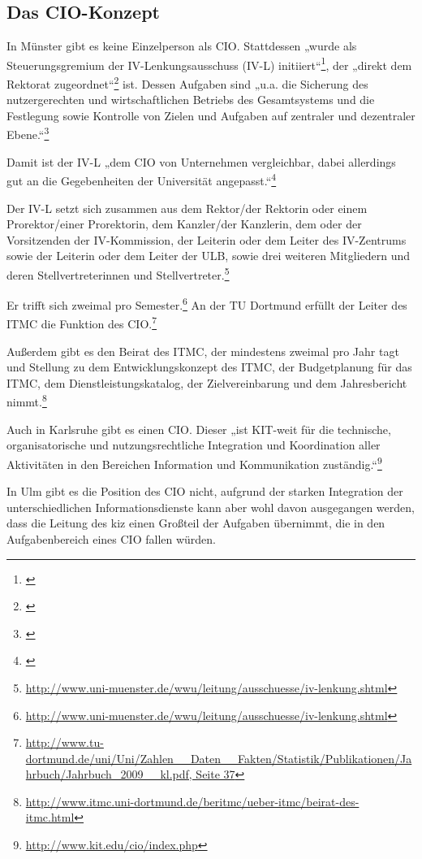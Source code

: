 \subsection{Das CIO-Konzept}
In Münster gibt es keine Einzelperson als CIO. Stattdessen „wurde als Steuerungsgremium der IV-Lenkungsausschuss (IV-L) initiiert“\footnote{\cite[59]{bode_informationsmanagement_2010}}, der „direkt dem Rektorat zugeordnet“\footnote{\cite[59]{bode_informationsmanagement_2010}} ist. Dessen Aufgaben sind „u.a. die Sicherung des nutzergerechten und wirtschaftlichen Betriebs des Gesamtsystems und die Festlegung sowie Kontrolle von Zielen und Aufgaben auf zentraler und dezentraler Ebene.“\footnote{\cite[9]{vogl_bericht_2013}}

Damit ist der IV-L „dem CIO von Unternehmen vergleichbar, dabei allerdings gut an die Gegebenheiten der Universität angepasst.“\footnote{\cite[60]{bode_informationsmanagement_2010}}

Der IV-L setzt sich zusammen aus dem Rektor/der Rektorin oder einem Prorektor/einer Prorektorin, dem Kanzler/der Kanzlerin, dem oder der Vorsitzenden der IV-Kommission, der Leiterin oder dem Leiter des IV-Zentrums sowie der Leiterin oder dem Leiter der ULB, sowie drei weiteren Mitgliedern und deren Stellvertreterinnen und Stellvertreter.\footnote{\url{http://www.uni-muenster.de/wwu/leitung/ausschuesse/iv-lenkung.shtml}}

Er trifft sich zweimal pro Semester.\footnote{\url{http://www.uni-muenster.de/wwu/leitung/ausschuesse/iv-lenkung.shtml}}
An der TU Dortmund erfüllt der Leiter des ITMC die Funktion des CIO.\footnote{\url{http://www.tu-dortmund.de/uni/Uni/Zahlen__Daten__Fakten/Statistik/Publikationen/Jahrbuch/Jahrbuch_2009__kl.pdf, Seite 37}}

Außerdem gibt es den Beirat des ITMC, der mindestens zweimal pro Jahr tagt und Stellung zu dem Entwicklungskonzept des ITMC, der Budgetplanung für das ITMC, dem Dienstleistungskatalog, der Zielvereinbarung und dem Jahresbericht nimmt.\footnote{\url{http://www.itmc.uni-dortmund.de/beritmc/ueber-itmc/beirat-des-itmc.html}}

Auch in Karlsruhe gibt es einen CIO. Dieser „ist KIT-weit für die technische, organisatorische und nutzungsrechtliche Integration und Koordination aller Aktivitäten in den Bereichen Information und Kommunikation zuständig.“\footnote{\url{http://www.kit.edu/cio/index.php}}

In Ulm gibt  es die Position des CIO nicht, aufgrund der starken Integration der unterschiedlichen Informationsdienste kann aber wohl davon ausgegangen werden, dass die Leitung des kiz einen Großteil der Aufgaben übernimmt, die in den Aufgabenbereich eines CIO fallen würden.

